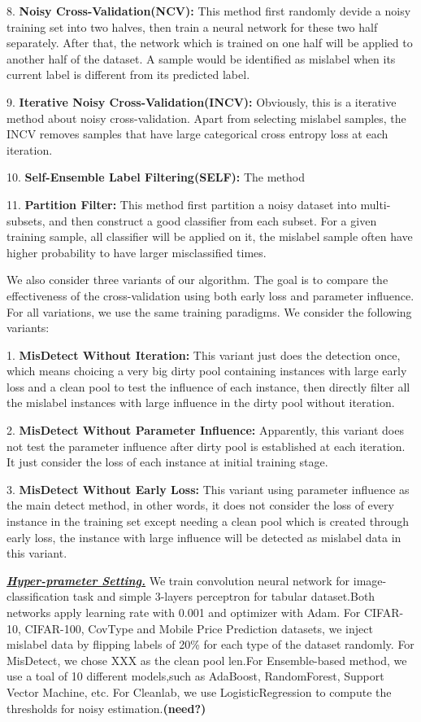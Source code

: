 8. \textbf{Noisy Cross-Validation(NCV):} This method first randomly devide a noisy training set into two halves, then train a neural network for these two half separately. After that, the network which is trained on one half will be applied to another half of the dataset. A sample would be identified as mislabel when its current label is different from its predicted label.

9. \textbf{Iterative Noisy Cross-Validation(INCV):} Obviously, this is a iterative method about noisy cross-validation. Apart from selecting mislabel samples, the INCV removes samples that have large categorical cross entropy loss at each iteration.

10. \textbf{Self-Ensemble Label Filtering(SELF):} The method 

11. \textbf{Partition Filter:} This method first partition a noisy dataset into multi-subsets, and then construct a good classifier from each subset. For a given training sample, all classifier will be applied on it, the mislabel sample often have higher probability to have larger misclassified times.

We also consider three variants of our algorithm. The goal is to compare the effectiveness of the cross-validation using both early loss and parameter influence. For all variations, we use the same training paradigms. We consider the following variants:

1. \textbf{MisDetect Without Iteration: } This variant just does the detection once, which means choicing a very big dirty pool containing instances with large early loss and a clean pool to test the influence of each instance, then directly filter all the mislabel instances with large influence in the dirty pool without iteration.

2. \textbf{MisDetect Without Parameter Influence:} Apparently, this variant does not test the parameter influence after dirty pool is established at each iteration. It just consider the loss of each instance at initial training stage.

3. \textbf{MisDetect Without Early Loss:} This variant using parameter influence as the main detect method, in other words, it does not consider the loss of every instance in the training set except needing a clean pool which is created through early loss, the instance with large influence will be detected as mislabel data in this variant.

\textbf{\textit{\underline{Hyper-prameter Setting.}}} We train convolution neural network for image-classification task and simple 3-layers perceptron for tabular dataset.Both networks apply learning rate with 0.001 and optimizer with Adam. For CIFAR-10, CIFAR-100, CovType and Mobile Price Prediction datasets, we inject mislabel data by flipping labels of 20\% for each type of the dataset randomly. For MisDetect, we chose XXX as the clean pool len.For Ensemble-based method, we use a toal of 10 different models,such as AdaBoost, RandomForest, Support Vector Machine, etc. For Cleanlab, we use LogisticRegression to compute the thresholds for noisy estimation.\textbf{(need?)}

